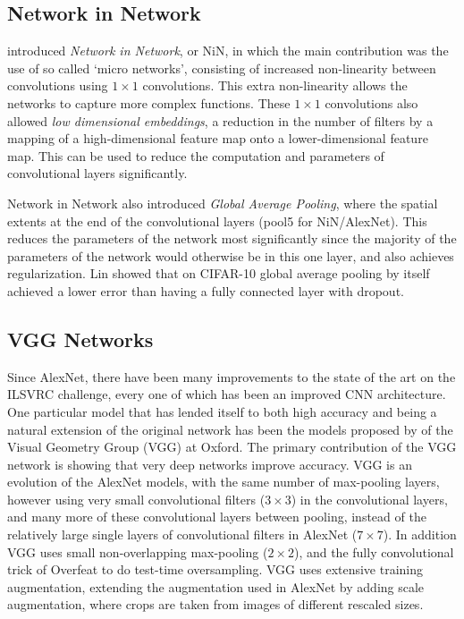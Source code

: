 \documentclass[thesis]{subfiles}
\begin{document}
\subsection{Network in Network}
\citet{Lin2013NiN} introduced \emph{Network in Network}, or NiN, in which the main contribution was the use of so called `micro networks', consisting of increased non-linearity between convolutions using $1\times 1$ convolutions. This extra non-linearity allows the networks to capture more complex functions. These $1\times 1$ convolutions also allowed \emph{low dimensional embeddings}, \ie a reduction in the number of filters by a mapping of a high-dimensional feature map onto a lower-dimensional feature map. This can be used to reduce the computation and parameters of convolutional layers significantly. 

Network in Network also introduced \emph{Global Average Pooling}, where the spatial extents at the end of the convolutional layers (\ie pool5 for NiN/AlexNet). This reduces the parameters of the network most significantly since the majority of the parameters of the network would otherwise be in this one layer, and also achieves regularization. Lin \etal showed that on CIFAR-10 global average pooling by itself achieved a lower error than having a fully connected layer with dropout.

\subsection{VGG Networks}
Since AlexNet, there have been many improvements to the state of the art on the ILSVRC challenge, every one of which has been an improved CNN architecture. One particular model that has lended itself to both high accuracy and being a natural extension of the original network has been the models proposed by \citet{Simonyan2014verydeep} of the Visual Geometry Group (VGG) at Oxford. The primary contribution of the VGG network is showing that very deep networks improve accuracy. VGG is an evolution of the AlexNet models, with the same number of max-pooling layers, however using very small convolutional filters ($3 \times 3$) in the convolutional layers, and many more of these convolutional layers between pooling, instead of the relatively large single layers of convolutional filters in AlexNet ($7\times 7$). In addition VGG uses small non-overlapping max-pooling ($2\times 2$), and the fully convolutional trick of Overfeat to do test-time oversampling. VGG uses extensive training augmentation, extending the augmentation used in AlexNet by adding scale augmentation, where crops are taken from images of different rescaled sizes. 
\end{document}

